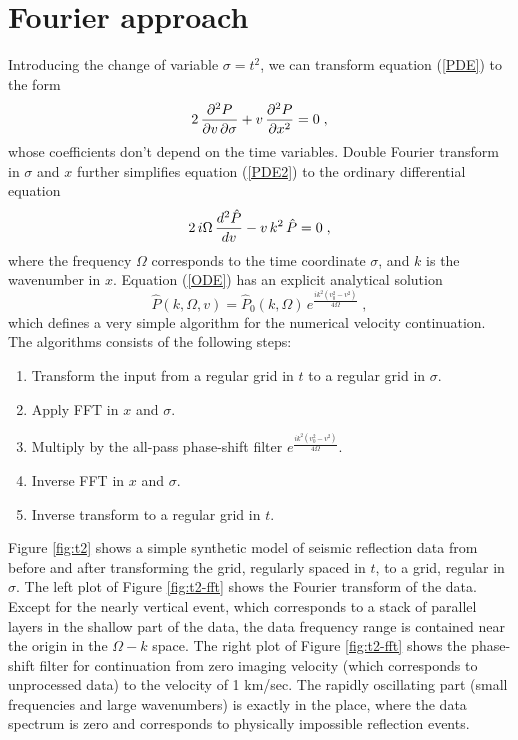 \section{Fourier approach}


\par
Introducing the change of variable $\sigma = t^2$, we can transform
equation (\ref{PDE}) to the form
\begin{equation}
  \label{PDE2}
  2\,{{\partial^2 P} \over {\partial v\, \partial \sigma}} +
  v\,{{\partial^2 P} \over {\partial x^2}} = 0\;,
\end{equation}
whose coefficients don't depend on the time variables.  Double Fourier
transform in $\sigma$ and $x$ further simplifies equation (\ref{PDE2})
to the ordinary differential equation
\begin{equation}
  \label{ODE}
  2\,i\Omega\,{{d^2 \hat{P}} \over {d v}} -
  v\,k^2\,\hat{P} = 0\;,
\end{equation}
where the frequency $\Omega$ corresponds to the time coordinate
$\sigma$, and $k$ is the wavenumber in $x$. Equation (\ref{ODE}) has
an explicit analytical solution
\begin{equation}
  \label{ODEsol}
  \hat{P} (k,\Omega,v) = \hat{P}_0 (k,\Omega)\,
  e^{\frac{i k^2(v_0^2-v^2)}{4\Omega}}\;,
\end{equation}
which defines a very simple algorithm for the numerical velocity
continuation. The algorithms consists of the following steps:
\begin{enumerate}
\item Transform the input from a regular grid in $t$ to a regular grid
  in $\sigma$.
\item Apply FFT in $x$ and $\sigma$.
\item Multiply by the all-pass phase-shift filter $e^{\frac{i
      k^2(v_0^2-v^2)}{4\Omega}}$.
\item Inverse FFT in $x$ and $\sigma$.
\item Inverse transform to a regular grid in $t$.
\end{enumerate}


Figure \ref{fig:t2} shows a simple synthetic model of seismic
reflection data from \cite[]{Claerbout.bei.95} before and after
transforming the grid, regularly spaced in $t$, to a grid, regular in
$\sigma$. The left plot of Figure \ref{fig:t2-fft} shows the Fourier
transform of the data. Except for the nearly vertical event, which
corresponds to a stack of parallel layers in the shallow part of the
data, the data frequency range is contained near the origin in the
$\Omega-k$ space.  The right plot of Figure \ref{fig:t2-fft} shows the
phase-shift filter for continuation from zero imaging velocity (which
corresponds to unprocessed data) to the velocity of 1 km/sec. The
rapidly oscillating part (small frequencies and large wavenumbers) is
exactly in the place, where the data spectrum is zero and corresponds
to physically impossible reflection events.

